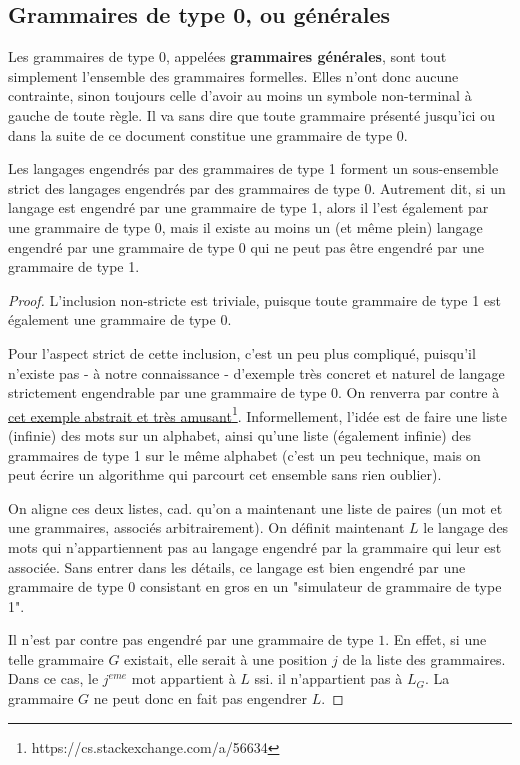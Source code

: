 \subsection{Grammaires de type 0, ou générales}

Les grammaires de type 0, appelées \textbf{grammaires générales}, sont tout simplement l'ensemble des grammaires formelles. Elles n'ont donc aucune contrainte, sinon toujours celle d'avoir au moins un symbole non-terminal à gauche de toute règle.
Il va sans dire que toute grammaire présenté jusqu'ici ou dans la suite de ce document constitue une grammaire de type $0$. 

\begin{lemma}
Les langages engendrés par des grammaires de type 1 forment un sous-ensemble strict des langages engendrés par des grammaires de type 0. Autrement dit, si un langage est engendré par une grammaire de type 1, alors il l'est également par une grammaire de type 0, mais il existe au moins un (et même plein) langage engendré par une grammaire de type 0 qui ne peut pas être engendré par une grammaire de type 1.  
\end{lemma}

\begin{proof}
L'inclusion non-stricte est triviale, puisque toute grammaire de type 1 est également une grammaire de type 0.

Pour l'aspect strict de cette inclusion, c'est un peu plus compliqué, puisqu'il n'existe pas - à notre connaissance - d'exemple très concret et naturel de langage strictement engendrable par une grammaire de type 0. On renverra par contre à \href{https://cs.stackexchange.com/a/56634}{cet exemple abstrait et très amusant}\footnote{https://cs.stackexchange.com/a/56634}. Informellement, l'idée est de faire une liste (infinie) des mots sur un alphabet, ainsi qu'une liste (également infinie) des grammaires de type 1 sur le même alphabet (c'est un peu technique, mais on peut écrire un algorithme qui parcourt cet ensemble sans rien oublier). 

On aligne ces deux listes, cad. qu'on a maintenant une liste de paires (un mot et une grammaires, associés arbitrairement). On définit maintenant $L$ le langage des mots qui n'appartiennent pas au langage engendré par la grammaire qui leur est associée. Sans entrer dans les détails, ce langage est bien engendré par une grammaire de type 0 consistant en gros en un "simulateur de grammaire de type 1".

Il n'est par contre pas engendré par une grammaire de type $1$. En effet, si une telle grammaire $G$ existait, elle serait à une position $j$ de la liste des grammaires. Dans ce cas, le $j^{eme}$ mot appartient à $L$ ssi. il n'appartient pas à $L_G$. La grammaire $G$ ne peut donc en fait pas engendrer $L$.
\end{proof}

